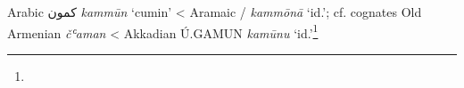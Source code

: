 \begin{etymology}\label{ety:kammun}
Arabic {كمون} \textit{kammūn} `cumin'
< Aramaic {/} \textit{kammōnā} `id.'; cf. cognates Old Armenian  \textit{čʿaman}
< Akkadian { Ú.GAMUN} \textit{kamūnu} `id.'\footnote{}
\end{etymology}